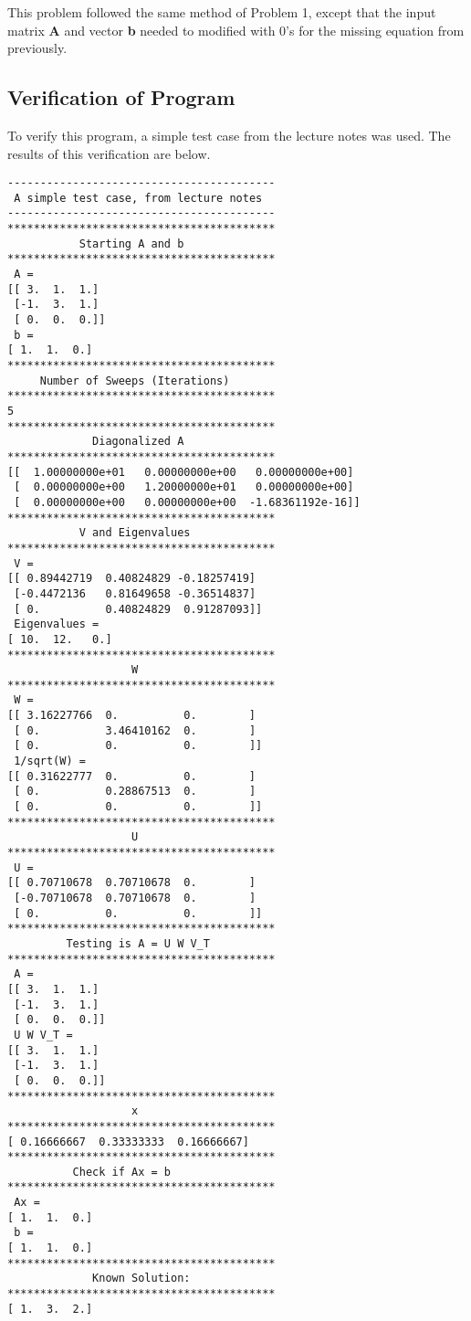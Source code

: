 \documentclass[10pt,letter]{article}
\begin{document}
This problem followed the same method of Problem 1, except that the input matrix \textbf{A} and vector \textbf{b} needed to modified with 0's for the missing equation from previously.

\subsection{Verification of Program}

To verify this program, a simple test case from the lecture notes was used. The results of this verification are below.

\begin{verbatim}
-----------------------------------------
 A simple test case, from lecture notes  
-----------------------------------------
*****************************************
           Starting A and b              
*****************************************
 A = 
[[ 3.  1.  1.]
 [-1.  3.  1.]
 [ 0.  0.  0.]]
 b = 
[ 1.  1.  0.]
*****************************************
     Number of Sweeps (Iterations)       
*****************************************
5
*****************************************
             Diagonalized A              
*****************************************
[[  1.00000000e+01   0.00000000e+00   0.00000000e+00]
 [  0.00000000e+00   1.20000000e+01   0.00000000e+00]
 [  0.00000000e+00   0.00000000e+00  -1.68361192e-16]]
*****************************************
           V and Eigenvalues             
*****************************************
 V = 
[[ 0.89442719  0.40824829 -0.18257419]
 [-0.4472136   0.81649658 -0.36514837]
 [ 0.          0.40824829  0.91287093]]
 Eigenvalues = 
[ 10.  12.   0.]
*****************************************
                   W                     
*****************************************
 W = 
[[ 3.16227766  0.          0.        ]
 [ 0.          3.46410162  0.        ]
 [ 0.          0.          0.        ]]
 1/sqrt(W) = 
[[ 0.31622777  0.          0.        ]
 [ 0.          0.28867513  0.        ]
 [ 0.          0.          0.        ]]
*****************************************
                   U                     
*****************************************
 U = 
[[ 0.70710678  0.70710678  0.        ]
 [-0.70710678  0.70710678  0.        ]
 [ 0.          0.          0.        ]]
*****************************************
         Testing is A = U W V_T          
*****************************************
 A = 
[[ 3.  1.  1.]
 [-1.  3.  1.]
 [ 0.  0.  0.]]
 U W V_T = 
[[ 3.  1.  1.]
 [-1.  3.  1.]
 [ 0.  0.  0.]]
*****************************************
                   x                     
*****************************************
[ 0.16666667  0.33333333  0.16666667]
*****************************************
          Check if Ax = b                
*****************************************
 Ax = 
[ 1.  1.  0.]
 b = 
[ 1.  1.  0.]
*****************************************
             Known Solution:             
*****************************************
[ 1.  3.  2.]
\end{verbatim}
\end{document}
